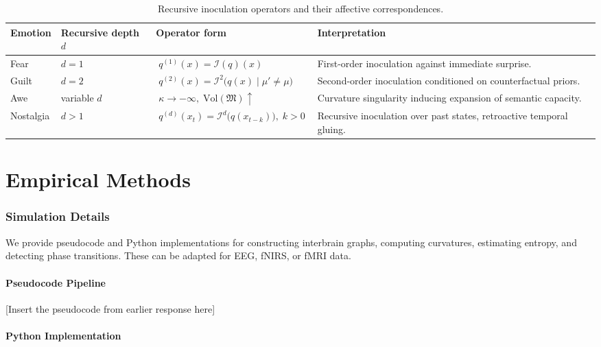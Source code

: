 \documentclass{article}
\theoremstyle{definition}
\begin{document}
\begin{table}[ht]
\centering
\caption{Recursive inoculation operators and their affective correspondences.}
\label{tab:inoculation}
\renewcommand{\arraystretch}{1.3}
\begin{tabularx}{\textwidth}{@{}l>{\centering\arraybackslash}X>{\centering\arraybackslash}X>{\centering\arraybackslash}X@{}}
\toprule
\textbf{Emotion} & \textbf{Recursive depth $d$} & \textbf{Operator form} & \textbf{Interpretation} \\
\midrule
Fear & $d=1$ &
$\;q^{(1)}(x) = \mathcal{I}(q)(x)\;$ &
First-order inoculation against immediate surprise. \\
\addlinespace
Guilt & $d=2$ &
$\;q^{(2)}(x) = \mathcal{I}^2\!\big(q(x)\mid \mu' \neq \mu\big)\;$ &
Second-order inoculation conditioned on counterfactual priors. \\
\addlinespace
Awe & variable $d$ &
$\;\kappa \to -\infty,\; \mathrm{Vol}(\mathfrak{M}) \uparrow\;$ &
Curvature singularity inducing expansion of semantic capacity. \\
\addlinespace
Nostalgia & $d>1$ &
$\;q^{(d)}(x_t) = \mathcal{I}^d\big(q(x_{t-k})\big),\; k>0\;$ &
Recursive inoculation over past states, retroactive temporal gluing. \\
\bottomrule
\end{tabularx}
\end{table}

\part{Empirical Methods}

\section{Simulation Details}

We provide pseudocode and Python implementations for constructing interbrain
graphs, computing curvatures, estimating entropy, and detecting phase
transitions. These can be adapted for EEG, fNIRS, or fMRI data.

\subsection{Pseudocode Pipeline}

[Insert the pseudocode from earlier response here]

\subsection{Python Implementation}
\end{document}

